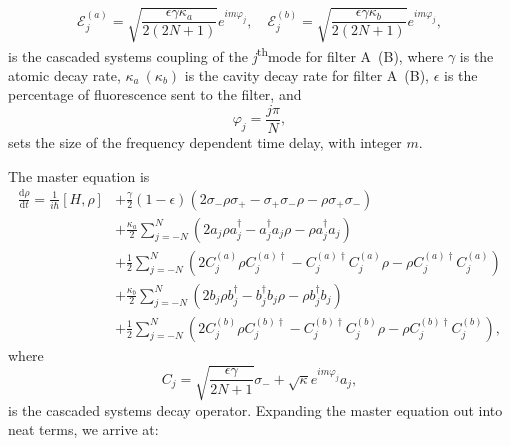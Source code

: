 \documentclass{article}
\newcommand{\ddt}[1][]{\frac{\mathrm{d} #1}{\mathrm{d}t}}
\newcommand{\ssth}{\textsuperscript{th}}
\begin{document}
\begin{equation}
	\mathcal{E}_{j}^{(a)} = \sqrt{\frac{\epsilon \gamma \kappa_{a} }{2 \left( 2N + 1 \right)}} e^{i m \varphi_{j}}, \quad \mathcal{E}_{j}^{(b)} = \sqrt{\frac{\epsilon \gamma \kappa_{b}}{2 \left( 2N + 1 \right)}} e^{i m \varphi_{j}},
\end{equation}
is the cascaded systems coupling of the \textit{j}\ssth mode for filter A~(B), where $\gamma$ is the atomic decay rate, $\kappa_{a}~(\kappa_{b})$ is the cavity decay rate for filter A~(B), $\epsilon$ is the percentage of fluorescence sent to the filter, and
\begin{equation}
	\varphi_{j} = \frac{j \pi}{N},
\end{equation}
sets the size of the frequency dependent time delay, with integer $m$.

The master equation is
\begin{align}\label{master_equation_full}
	\ddt[\rho] = \frac{1}{i \hbar} [H, \rho] &+ \frac{\gamma}{2}(1 - \epsilon) \left(2 \sigma_{-} \rho \sigma_{+} - \sigma_{+} \sigma_{-} \rho - \rho \sigma_{+} \sigma_{-}\right) \nonumber \\
	&+ \frac{\kappa_{a}}{2} \sum_{j=-N}^{N} \left( 2 a_{j} \rho a^{\dagger}_{j} - a^{\dagger}_{j} a_{j} \rho - \rho a^{\dagger}_{j} a_{j} \right) \\
	&+ \frac{1}{2} \sum_{j=-N}^{N} \left(2 C_{j}^{(a)} \rho C^{(a) \dagger}_{j} - C^{(a) \dagger}_{j} C_{j}^{(a)} \rho - \rho C^{(a) \dagger}_{j} C_{j}^{(a)} \right) \nonumber \\
	&+ \frac{\kappa_{b}}{2} \sum_{j=-N}^{N} \left( 2 b_{j} \rho b^{\dagger}_{j} - b^{\dagger}_{j} b_{j} \rho - \rho b^{\dagger}_{j} b_{j} \right) \\
	&+ \frac{1}{2} \sum_{j=-N}^{N} \left(2 C_{j}^{(b)} \rho C^{(b) \dagger}_{j} - C^{(b) \dagger}_{j} C_{j}^{(b)} \rho - \rho C^{(b) \dagger}_{j} C_{j}^{(b)} \right), \nonumber
\end{align}
where
\begin{equation}
	C_{j} = \sqrt{\frac{\epsilon \gamma}{2N + 1}} \sigma_{-} + \sqrt{\kappa} e^{i m \varphi_{j}} a_{j},
\end{equation}
is the cascaded systems decay operator. Expanding the master equation out into neat terms, we arrive at:
\end{document}
